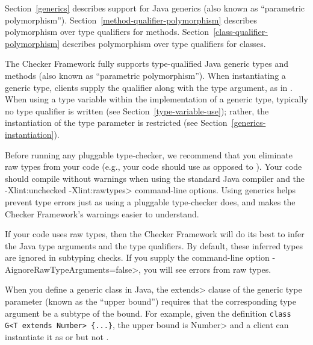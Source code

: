 
Section~\ref{generics} describes support for Java generics (also known as
``parametric polymorphism'').
Section~\ref{method-qualifier-polymorphism} describes polymorphism over
type qualifiers for methods. Section~\ref{class-qualifier-polymorphism} describes
polymorphism over type qualifiers for classes.



The Checker Framework fully supports
type-qualified Java generic types and methods (also known as ``parametric
polymorphism'').
When instantiating a generic type,
clients supply the qualifier along with the type argument, as in
.
When using a type variable  within the implementation of a generic type,
typically no type qualifier is written (see Section~\ref{type-variable-use});
rather, the instantiation of the type parameter is restricted (see
Section~\ref{generics-instantiation}).



Before running any pluggable type-checker, we recommend that you eliminate
raw types from your code (e.g., your code should use  as
opposed to ).
Your code should compile without warnings when using the standard Java
compiler and the \<-Xlint:unchecked -Xlint:rawtypes> command-line options.
Using generics helps prevent type errors just as using a pluggable
type-checker does, and makes the Checker Framework's warnings easier to
understand.

If your code uses raw types, then the Checker Framework will do its best to
infer the Java type arguments and the type qualifiers.  By default, these
inferred types are ignored in subtyping checks. If you supply the
command-line option \<-AignoreRawTypeArguments=false>, you will see errors
from raw types.



When you define a generic class in Java, the \<extends> clause
of the generic type parameter (known as the ``upper bound'') requires that
the corresponding type argument be a subtype of the bound.
For example, given the definition
\verb|class G<T extends Number> {...}|,
the upper bound is \<Number>
and a client can instantiate it as  or 
but not .

